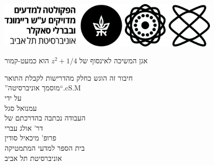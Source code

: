 \documentclass[11pt]{article}
\begin{document}
\begin{titlepage}
    \begin{center}
        \vspace*{0.05cm}
        \includegraphics[width=0.8\textwidth]{figures/Logo_Exact_Sciences_Hebrew_Black.jpeg}\\
        \vspace{3cm}
        {\huge אגן המשיכה לאינסוף של $z^2+1/4$ הוא כמעט-קמור \par}
        \vspace{1cm}
        {\large חיבור זה הוגש כחלק מהדרישות לקבלת התואר\\
        \textquotedblright מוסמך אוניברסיטה\textquotedblleft\text{ }\textendash \text{ }.cS.M}\\
        \vspace{2cm}
        { על ידי}\\
        \vspace{0.3cm}
        {\large {עמנואל סגל}}\\
        \vspace{1.5cm}
        {\large העבודה נכתבה בהדרכתם של}\\
        \vspace{0.3cm}
        {\huge דר' אולג עברי} \\
        {\huge פרופ' מיכאיל סודין\\
        \vspace{1cm}
        {\Large בית הספר למדעי המתמטיקה \\ אוניברסיטת תל אביב}}
    \end{center}
\end{titlepage}
\end{document}
